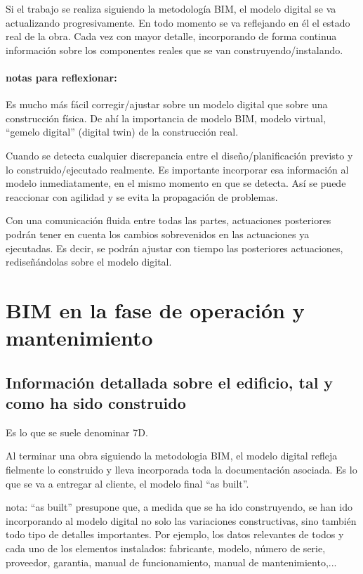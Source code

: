 \documentclass[spanish,12pt,a4paper,final,oneside]{book}
\begin{document}
Si el trabajo se realiza siguiendo la metodología BIM, el modelo digital se va actualizando progresivamente. En todo momento se va reflejando en él el estado real de la obra. Cada vez con mayor detalle, incorporando de forma continua información sobre los componentes reales que se van construyendo/instalando.

\subsubsection{notas para reflexionar:}
Es mucho más fácil corregir/ajustar sobre un modelo digital que sobre una construcción física. De ahí la importancia de modelo BIM, modelo virtual, ``gemelo digital'' (digital twin) de la construcción real.

Cuando se detecta cualquier discrepancia entre el diseño/planificación previsto y lo construido/ejecutado realmente. Es importante incorporar esa información al modelo inmediatamente, en el mismo momento en que se detecta. Así se puede reaccionar con agilidad y se evita la propagación de problemas.

Con una comunicación fluida entre todas las partes, actuaciones posteriores podrán tener en cuenta los cambios sobrevenidos en las actuaciones ya ejecutadas. Es decir, se podrán ajustar con tiempo las posteriores actuaciones, rediseñándolas sobre el modelo digital.

\chapter{BIM en la fase de operación y mantenimiento}

\section{Información detallada sobre el edificio, tal y como ha sido construido}
Es lo que se suele denominar 7D.

Al terminar una obra siguiendo la metodologia BIM,  el modelo digital refleja fielmente lo construido y lleva incorporada toda la documentación asociada. Es lo que se va a entregar al cliente, el modelo final ``as built''.

nota: ``as built'' presupone que, a medida que se ha ido construyendo, se han ido incorporando al modelo digital no solo las variaciones constructivas, sino también todo tipo de detalles importantes. Por ejemplo, los datos relevantes de todos y cada uno de los elementos instalados:  fabricante, modelo, número de serie, proveedor, garantia, manual de funcionamiento, manual de mantenimiento,...
\end{document}
